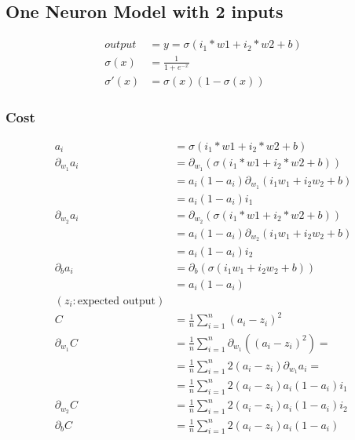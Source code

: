 \documentclass{article}
\begin{document}
\subsection{One Neuron Model with 2 inputs}
\begin{center}
	
\end{center}
\begin{align}
	output &=  y = \sigma(i_1*w1+i_2*w2 +b)  \\
	\sigma(x) &= \frac{1}{1+e^{-x}} \\
	\sigma'(x) &= \sigma(x)(1 -\sigma(x))
\end{align}

\subsubsection{Cost}

\def\pd[#1]{\partial_{#1}}
\def\avgsum[#1,#2]{\frac{1}{#2}\sum_{#1=1}^{#2}}

\begin{align}
	a_i &= \sigma(i_1*w1+i_2*w2 +b) \\
	\partial_{w_1} a_i  &= \partial_{w_1}( \sigma(i_1*w1+i_2*w2 +b) ) \\
	&= a_i(1-a_i)\partial_{w_1}(i_1w_1+i_2w_2 + b) \\
	&=a_i(1-a_i)i_1 \\
\partial_{w_2} a_i  &= \partial_{w_2}( \sigma(i_1*w1+i_2*w2 +b) ) \\
&= a_i(1-a_i)\partial_{w_2}(i_1w_1+i_2w_2 + b) \\
&=a_i(1-a_i)i_2 \\
\partial_{b} a_i  &= \partial_{b}(\sigma(i_1w_1+i_2w_2 + b)) \\
&=a_i(1-a_i) \\
(z_i :  \text{expected output}) \\
  C &= \avgsum[i, n](a_i - z_i)^2 \\
\pd[w_1] C
&= \avgsum[i, n]\pd[w_1]\left((a_i - z_i)^2\right) = \\
&= \avgsum[i, n]2(a_i - z_i)\pd[w_1]a_i = \\
&= \avgsum[i, n]2(a_i - z_i)a_i(1 - a_i)i_1 \\
\pd[w_2] C &= \avgsum[i, n]2(a_i - z_i)a_i(1 - a_i)i_2 \\
\pd[b] C &= \avgsum[i, n]2(a_i - z_i)a_i(1 - a_i)
\end{align}
\end{document}
